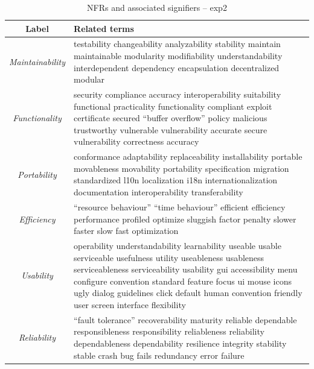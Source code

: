\documentclass[]{sig-alternate}
\begin{document}
\begin{table}
	\centering
\begin{tabular}{c|p{11cm}}
\toprule
\textbf{Label} & \textbf{Related terms} \\
\midrule
\emph{Maintainability} &
testability changeability analyzability stability maintain maintainable modularity modifiability understandability interdependent dependency encapsulation decentralized modular\\ \hline
\emph{Functionality} &
security compliance accuracy interoperability suitability functional practicality functionality compliant exploit certificate secured ``buffer overflow'' policy malicious trustworthy vulnerable vulnerability accurate secure vulnerability correctness accuracy\\ \hline
\emph{Portability} &
conformance adaptability replaceability installability portable movableness movability portability specification migration standardized l10n localization i18n internationalization documentation interoperability transferability\\ \hline
\emph{Efficiency} &
``resource behaviour'' ``time behaviour'' efficient efficiency performance profiled optimize sluggish factor penalty slower faster slow fast optimization\\ \hline
\emph{Usability} &
operability understandability learnability useable usable serviceable usefulness utility useableness usableness serviceableness serviceability usability gui accessibility menu configure convention standard feature focus ui mouse icons ugly dialog guidelines click default human convention friendly user screen interface flexibility\\ \hline
\emph{Reliability} &
``fault tolerance'' recoverability maturity reliable dependable responsibleness responsibility reliableness reliability dependableness dependability resilience integrity stability stable crash bug fails redundancy error failure\\ 
\bottomrule
\end{tabular}
	\caption{NFRs and associated signifiers -- \textsf{exp2}}
	\label{tbl:wnsig}

\end{table}
\end{document}
